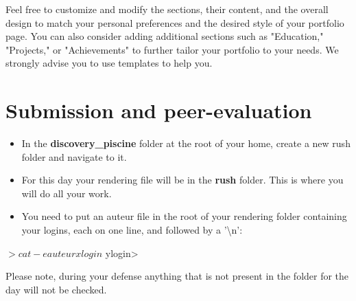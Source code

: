 \documentclass[12pt, a4paper]{report}
\begin{document}
	Feel free to customize and modify the sections, their content, and the overall design to match your personal preferences and the desired style of your portfolio page. You can also consider adding additional sections such as "Education," "Projects," or "Achievements" to further tailor your portfolio to your needs. We strongly advise you to use templates to help you.

	

\chapter{Submission and peer-evaluation}
	\begin{itemize}
		\item In the \textbf{discovery\_piscine} folder at the root of your home, create a new rush folder and navigate to it. 
		\item For this day your rendering file will be in the \textbf{rush} folder. This is where you will do all your work.
		\item You need to put an auteur file in the root of your rendering folder containing your
		logins, each on one line, and followed by a '\textbackslash n':
	\end{itemize}
	\begin{inverseverbatim}
		$> cat -e auteur
		xlogin$
		ylogin$
		$>
	\end{inverseverbatim}

	\begin{caja}
		\vspace{.8cm}
		\footnotesize Please note, during your defense anything that is not present in the folder for the day will not be checked.
		\end{caja}
\end{document}
